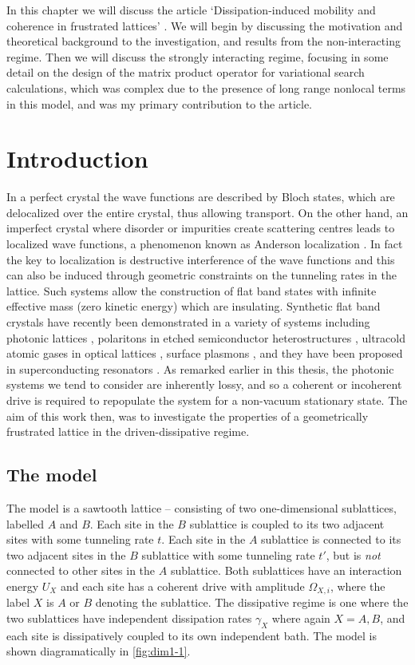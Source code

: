 In this chapter we will discuss the article `Dissipation-induced mobility and coherence in frustrated lattices' \cite{Owen2017}. We will begin by discussing the motivation and theoretical background to the investigation, and results from the non-interacting regime. Then we will discuss the strongly interacting regime, focusing in some detail on the design of the matrix product operator for variational search calculations, which was complex due to the presence of long range nonlocal terms in this model, and was my primary contribution to the article.

\section{Introduction}
In a perfect crystal the wave functions are described by Bloch states, which are delocalized over the entire crystal, thus allowing transport. On the other hand, an imperfect crystal where disorder or impurities create scattering centres leads to localized wave functions, a phenomenon known as Anderson localization \cite{Anderson1958,Lee1985,Segev2013}. In fact the key to localization is destructive interference of the wave functions and this can also be induced through geometric constraints on the tunneling rates in the lattice. Such systems allow the construction of flat band states with infinite effective mass (zero kinetic energy) which are insulating. Synthetic flat band crystals have recently been demonstrated in a variety of systems including photonic lattices \cite{Guzman-Silva2014,Vicencio2015,Mukherjee2015,Mukherjee2015a}, polaritons in etched semiconductor heterostructures \cite{Jacqmin2014,Baboux2016}, ultracold atomic gases in optical lattices \cite{Taie2015}, surface plasmons \cite{Nakata2012,Kajiwara2016}, and they have been proposed in superconducting resonators \cite{Yang2016}. As remarked earlier in this thesis, the photonic systems we tend to consider are inherently lossy, and so a coherent or incoherent drive is required to repopulate the system for a non-vacuum stationary state. The aim of this work then, was to investigate the properties of a geometrically frustrated lattice in the driven-dissipative regime.

\subsection{The model}
The model is a sawtooth lattice -- consisting of two one-dimensional sublattices, labelled \(A\) and \(B\). Each site in the \(B\) sublattice is coupled to its two adjacent sites with some tunneling rate \(t\). Each site in the \(A\) sublattice is connected to its two adjacent sites in the \(B\) sublattice with some tunneling rate \(t'\), but is \emph{not} connected to other sites in the \(A\) sublattice. Both sublattices have an interaction energy \(U_{X}\) and each site has a coherent drive with amplitude \(\Omega_{X,i}\), where the label \(X\) is \(A\) or \(B\) denoting the sublattice. The dissipative regime is one where the two sublattices have independent dissipation rates \(\gamma_{X}\) where again \(X = A,B\), and each site is dissipatively coupled to its own independent bath. The model is shown diagramatically in \cref{fig:dim1-1}.

